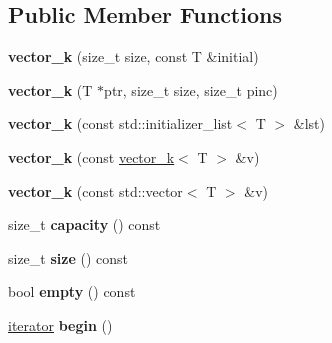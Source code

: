 \subsection*{Public Member Functions}
\begin{DoxyCompactItemize}
\item 
\hypertarget{classkeycpp_1_1vector__k_a1f65dfce13d605312c497195081b71fa}{{\bfseries vector\-\_\-k} (size\-\_\-t size, const T \&initial)}\label{classkeycpp_1_1vector__k_a1f65dfce13d605312c497195081b71fa}

\item 
\hypertarget{classkeycpp_1_1vector__k_a6902434fbd3b5ebbbedc1b068c3df3ec}{{\bfseries vector\-\_\-k} (T $\ast$ptr, size\-\_\-t size, size\-\_\-t pinc)}\label{classkeycpp_1_1vector__k_a6902434fbd3b5ebbbedc1b068c3df3ec}

\item 
\hypertarget{classkeycpp_1_1vector__k_a5b6df14409684df91f883c3bb33204f5}{{\bfseries vector\-\_\-k} (const std\-::initializer\-\_\-list$<$ T $>$ \&lst)}\label{classkeycpp_1_1vector__k_a5b6df14409684df91f883c3bb33204f5}

\item 
\hypertarget{classkeycpp_1_1vector__k_a694c6c797022382b57e2d51350e39afc}{{\bfseries vector\-\_\-k} (const \hyperlink{classkeycpp_1_1vector__k}{vector\-\_\-k}$<$ T $>$ \&v)}\label{classkeycpp_1_1vector__k_a694c6c797022382b57e2d51350e39afc}

\item 
\hypertarget{classkeycpp_1_1vector__k_a5e130370253f66d9968c35d41228bef4}{{\bfseries vector\-\_\-k} (const std\-::vector$<$ T $>$ \&v)}\label{classkeycpp_1_1vector__k_a5e130370253f66d9968c35d41228bef4}

\item 
\hypertarget{classkeycpp_1_1vector__k_a651efbae7ea28e3e4cc3a07375a8de72}{size\-\_\-t {\bfseries capacity} () const }\label{classkeycpp_1_1vector__k_a651efbae7ea28e3e4cc3a07375a8de72}

\item 
\hypertarget{classkeycpp_1_1vector__k_a829c7caf8f696e161375d18b715c918a}{size\-\_\-t {\bfseries size} () const }\label{classkeycpp_1_1vector__k_a829c7caf8f696e161375d18b715c918a}

\item 
\hypertarget{classkeycpp_1_1vector__k_abbba6e3a7e0dc425a78645f78417c62c}{bool {\bfseries empty} () const }\label{classkeycpp_1_1vector__k_abbba6e3a7e0dc425a78645f78417c62c}

\item 
\hypertarget{classkeycpp_1_1vector__k_a57ec9796301fc1db249c531cbcb02b86}{\hyperlink{classkeycpp_1_1_pointer_iterator}{iterator} {\bfseries begin} ()}\label{classkeycpp_1_1vector__k_a57ec9796301fc1db249c531cbcb02b86}


\end{DoxyCompactItemize}
